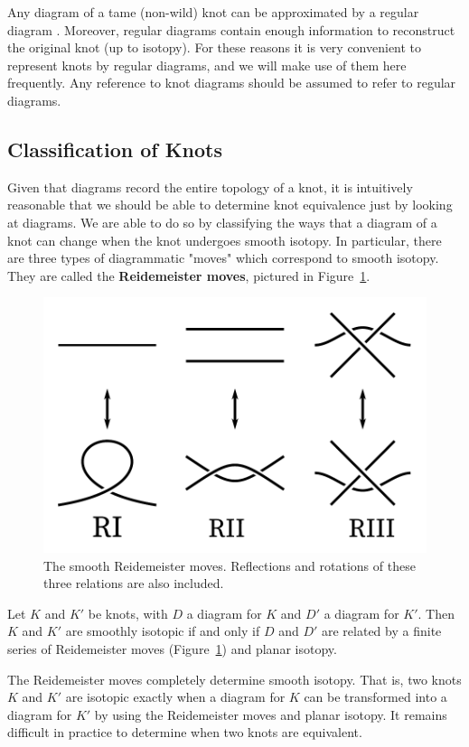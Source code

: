 Any diagram of a tame (non-wild) knot can be approximated by a regular diagram \cite{murasugi1996}.
Moreover, regular diagrams contain enough information to reconstruct the original knot (up to isotopy). For these reasons it is very convenient to represent knots by regular diagrams, and we will make use of them here frequently. Any reference to knot diagrams should be assumed to refer to regular diagrams.

\subsection{Classification of Knots}

Given that diagrams record the entire topology of a knot, it is intuitively reasonable that we should be able to determine knot equivalence just by looking at diagrams. We are able to do so by classifying the ways that a diagram of a knot can change when the knot undergoes smooth isotopy. In particular, there are three types of diagrammatic "moves" which correspond to smooth isotopy. They are called the \textbf{Reidemeister moves}, pictured in Figure~\ref{fig:redemeister-smooth}.

\begin{figure}[ht!]
    \centering
    \includegraphics[width=0.5\linewidth]{images/smooth-redeimeister.pdf}
    \caption{The smooth Reidemeister moves. Reflections and rotations of these three relations are also included.}
    \label{fig:redemeister-smooth}
\end{figure}

\begin{theorem}
    Let $K$ and $K'$ be knots, with $D$ a diagram for $K$ and $D'$ a diagram for $K'$. 
    Then $K$ and $K'$ are smoothly isotopic if and only if $D$ and $D'$ are related by a finite series of Reidemeister moves (Figure~\ref{fig:redemeister-smooth}) and planar isotopy.
\end{theorem}

The Reidemeister moves completely determine smooth isotopy. That is, two knots $K$ and $K'$ are isotopic exactly when a diagram for $K$ can be transformed into a diagram for $K'$ by using the Reidemeister moves and planar isotopy. It remains difficult in practice to determine when two knots are equivalent. 

